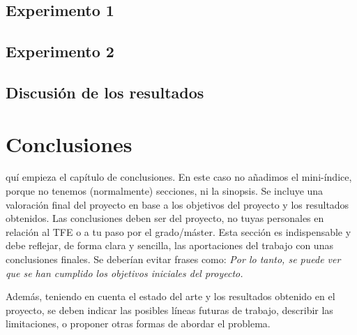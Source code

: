 \documentclass[a4paper,11pt,reqno,twoside]{memoir}
\begin{document}
\section{Experimento 1}
\label{sec:experimento_1}

\section{Experimento 2}
\label{sec:experimento_2}

\section{Discusión de los resultados}
\label{sec:discusion}


\clearemptydoublepage
\chapter{Conclusiones}
\label{cap:conclusiones}
quí empieza el capítulo de conclusiones. En este caso no añadimos el mini-índice, porque no tenemos (normalmente) secciones, ni la sinopsis. Se incluye una valoración final del proyecto en base a los objetivos del proyecto y los resultados obtenidos. Las conclusiones deben ser del proyecto, no tuyas personales en relación al TFE o a tu paso por el grado/máster.
Esta sección es indispensable y debe reflejar, de forma clara y sencilla, las aportaciones del trabajo con unas conclusiones finales. Se deberían evitar frases como: \textit{Por lo tanto, se puede ver que se han cumplido los objetivos iniciales del proyecto.}

Además, teniendo en cuenta el estado del arte y los resultados obtenido en el proyecto, se deben indicar las posibles líneas futuras de trabajo, describir las limitaciones, o proponer otras formas de abordar el problema.


%
%
\backmatter


\clearemptydoublepage



%
%
 
\end{document}
